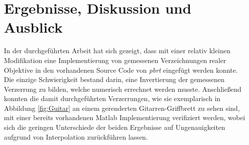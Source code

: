 \newpage
\section{Ergebnisse, Diskussion und Ausblick}

In der durchgeführten Arbeit hat sich gezeigt, dass mit einer relativ kleinen Modifikation eine Implementierung von gemessenen Verzeichnungen realer Objektive in den vorhandenen Source Code von \textit{pbrt} eingefügt werden konnte. Die einzige Schwierigkeit bestand darin, eine Invertierung der gemessenen Verzerrung zu bilden, welche numerisch errechnet werden musste. Anschließend konnten die damit durchgeführten Verzerrungen, wie sie exemplarisch in Abbildung \ref{fig:Guitar} an einem gerenderten Gitarren-Griffbrett zu sehen sind, mit einer bereits vorhandenen Matlab Implementierung verifiziert werden, wobei sich die geringen Unterschiede der beiden Ergebnisse auf Ungenauigkeiten aufgrund von Interpolation zurückführen lassen.\\


